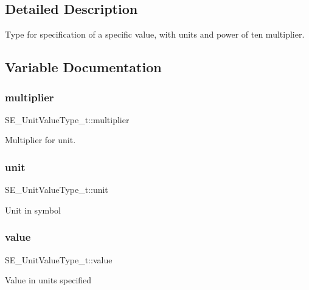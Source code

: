 \subsection{Detailed Description}
Type for specification of a specific value, with units and power of ten multiplier. 

\subsection{Variable Documentation}
\mbox{\label{group__UnitValueType_gad8cc28fe5b8c89ba39ea5a7f440dc024}} 
\subsubsection{\texorpdfstring{multiplier}{multiplier}}
{\footnotesize\ttfamily S\+E\+\_\+\+Unit\+Value\+Type\+\_\+t\+::multiplier}

Multiplier for \textquotesingle{}unit\textquotesingle{}. \mbox{\label{group__UnitValueType_ga1f1f3ce4391af53b2ef4dd5a3597efc4}} 
\subsubsection{\texorpdfstring{unit}{unit}}
{\footnotesize\ttfamily S\+E\+\_\+\+Unit\+Value\+Type\+\_\+t\+::unit}

Unit in symbol \mbox{\label{group__UnitValueType_gaf0db03a368be714590179d34320e67b6}} 
\subsubsection{\texorpdfstring{value}{value}}
{\footnotesize\ttfamily S\+E\+\_\+\+Unit\+Value\+Type\+\_\+t\+::value}

Value in units specified 